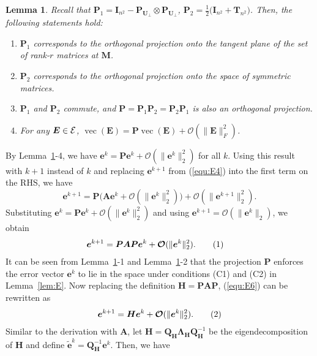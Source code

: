 \documentclass{article}
\def\E{{\cal E}}
\newtheorem{lemma}{Lemma}
\newcommand{\norm}[1]{\|#1\|} %
\newcommand\numberthis{\addtocounter{equation}{1}\tag{\theequation}}
\DeclareMathOperator*{\vect}{vec}
\begin{document}
\begin{lemma} \label{lem:e}
Recall that $\bm P_1 = \bm I_{n^2} - \bm P_{\bm U_\perp} \otimes \bm P_{\bm U_\perp}$, $\bm P_2 = \frac{1}{2} \bigl(\bm I_{n^2} + \bm T_{n^2}\bigr)$. Then, the following statements hold:
\begin{enumerate}
    \item $\bm P_1$ corresponds to the orthogonal projection onto the tangent plane of the set of rank-$r$ matrices at $\bm M$.
    \item $\bm P_2$ corresponds to the orthogonal projection onto the space of symmetric matrices.
    \item $\bm P_1$ and $\bm P_2$ commute, and $\bm P = \bm P_1 \bm P_2 = \bm P_2 \bm P_1$ is also an orthogonal projection.
    \item For any $\bm E \in \E$, $\vect (\bm E) = \bm P \vect (\bm E) + \bm{\mathcal{O}}(\norm{\bm E}_F^2)$.
\end{enumerate}
\end{lemma}
\noindent By Lemma~\ref{lem:e}-4, we have $\bm e^{k} = \bm P \bm e^{k} + \bm{\mathcal{O}}(\norm{\bm e^{k}}_2^2)$ for all $k$. Using this result with $k+1$ instead of $k$ and replacing $\bm e^{k+1}$ from (\ref{equ:E4}) into the first term on the RHS, we have $$\bm e^{k+1} = \bm P \bigl(\bm A \bm e^k + \bm{\mathcal{O}}(\norm{\bm e^k}_2^2)\bigr) + \bm{\mathcal{O}}(\norm{\bm e^{k+1}}_2^2) .$$
Substituting $\bm e^{k} = \bm P \bm e^{k} + \bm{\mathcal{O}}(\norm{\bm e^{k}}_2^2)$ and using $\bm e^{k+1} = \bm{\mathcal{O}}(\norm{\bm e^k}_2)$, we obtain
\begin{align*}
    \bm e^{k+1} &= \bm P \bm A \bm P \bm e^k + \bm{\mathcal{O}}(\norm{\bm e^k}_2^2) . \numberthis \label{equ:E6}
\end{align*}
It can be seen from Lemma~\ref{lem:e}-1 and Lemma~\ref{lem:e}-2 that the projection $\bm P$ enforces the error vector $\bm e^k$ to lie in the space under conditions (C1) and (C2) in Lemma~\ref{lem:E}.
Now replacing the definition $\bm H = \bm P \bm A \bm P$, (\ref{equ:E6}) can be rewritten as
\begin{align}
    \bm e^{k+1} = \bm H \bm e^k + \bm{\mathcal{O}}(\norm{\bm e^k}_2^2) . \numberthis \label{equ:E7}
\end{align}
Similar to the derivation with $\bm A$, let $\bm H = \bm Q_{\bm H} \bm \Lambda_{\bm H} \bm Q_{\bm H}^{-1}$ be the eigendecomposition of $\bm H$ and define $\tilde{\bm e}^k = \bm Q^{-1}_{\bm H} \bm e^k$. Then, we have
\end{document}
